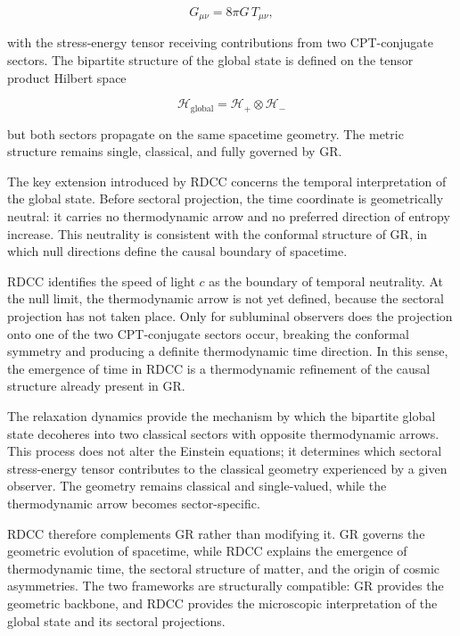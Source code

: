 \documentclass[11pt,a4paper]{article}
\begin{document}
\[
G_{\mu\nu} = 8\pi G\, T_{\mu\nu},
\]


with the stress-energy tensor receiving contributions from two CPT-conjugate
sectors. The bipartite structure of the global state is defined on the tensor
product Hilbert space


\[
\mathcal{H}_\text{global} = \mathcal{H}_+ \otimes \mathcal{H}_-
\]


but both sectors propagate on the same spacetime geometry. The metric
structure remains single, classical, and fully governed by GR.

The key extension introduced by RDCC concerns the temporal interpretation of
the global state. Before sectoral projection, the time coordinate is
geometrically neutral: it carries no thermodynamic arrow and no preferred
direction of entropy increase. This neutrality is consistent with the
conformal structure of GR, in which null directions define the causal boundary
of spacetime.

RDCC identifies the speed of light $c$ as the boundary of temporal neutrality.
At the null limit, the thermodynamic arrow is not yet defined, because the
sectoral projection has not taken place. Only for subluminal observers does the
projection onto one of the two CPT-conjugate sectors occur, breaking the
conformal symmetry and producing a definite thermodynamic time direction. In
this sense, the emergence of time in RDCC is a thermodynamic refinement of the
causal structure already present in GR.

\vspace{1.0em}

The relaxation dynamics provide the mechanism by which the bipartite global
state decoheres into two classical sectors with opposite thermodynamic arrows.
This process does not alter the Einstein equations; it determines which
sectoral stress-energy tensor contributes to the classical geometry experienced
by a given observer. The geometry remains classical and single-valued, while
the thermodynamic arrow becomes sector-specific.

\vspace{1.0em}

RDCC therefore complements GR rather than modifying it. GR governs the
geometric evolution of spacetime, while RDCC explains the emergence of
thermodynamic time, the sectoral structure of matter, and the origin of cosmic
asymmetries. The two frameworks are structurally compatible: GR provides the
geometric backbone, and RDCC provides the microscopic interpretation of the
global state and its sectoral projections.
\end{document}
